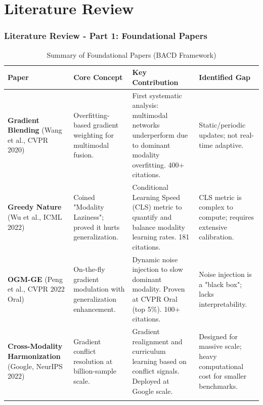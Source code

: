 \documentclass[serif, aspectratio=169]{beamer}
\begin{document}
\section{Literature Review}

\begin{frame}{}
    \frametitle<presentation>{Literature Review - Part 1: Foundational Papers}
\tiny{
\begin{table}
    \caption{Summary of Foundational Papers (BACD Framework)}	
    \label{tab:litreview-foundational} 

    \begin{tabularx}{\textwidth}{p{2.0cm}p{2.5cm}p{3.5cm}p{3.5cm}} 
        \toprule
        \textbf{Paper} & \textbf{Core Concept} & \textbf{Key Contribution} & \textbf{Identified Gap} \\ 		
        \midrule

        \textbf{Gradient Blending} (Wang et al., CVPR 2020) &
        Overfitting-based gradient weighting for multimodal fusion. &
        First systematic analysis: multimodal networks underperform due to dominant modality overfitting. 400+ citations. &
        Static/periodic updates; not real-time adaptive. \\ \hline

        \textbf{Greedy Nature} (Wu et al., ICML 2022) &
        Coined "Modality Laziness"; proved it hurts generalization. &
        Conditional Learning Speed (CLS) metric to quantify and balance modality learning rates. 181 citations. &
        CLS metric is complex to compute; requires extensive calibration. \\ \hline

        \textbf{OGM-GE} (Peng et al., CVPR 2022 Oral) &
        On-the-fly gradient modulation with generalization enhancement. &
        Dynamic noise injection to slow dominant modality. Proven at CVPR Oral (top 5\%). 100+ citations. &
        Noise injection is a "black box"; lacks interpretability. \\ \hline

        \textbf{Cross-Modality Harmonization} (Google, NeurIPS 2022) &
        Gradient conflict resolution at billion-sample scale. &
        Gradient realignment and curriculum learning based on conflict signals. Deployed at Google scale. &
        Designed for massive scale; heavy computational cost for smaller benchmarks. \\

        \noalign{\smallskip}\hline
    \end{tabularx}
\end{table}}
\end{frame}
\end{document}
